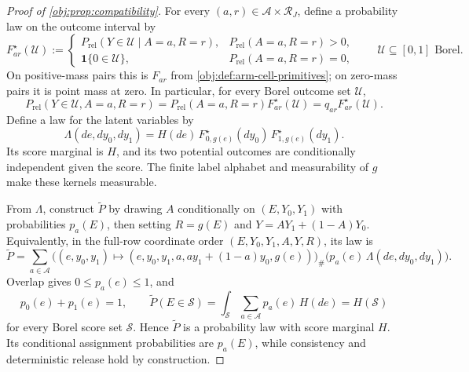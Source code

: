 \documentclass[11pt]{article}
\begin{document}
\begin{proof}[Proof of \cref{obj:prop:compatibility}]
For every \((a,r)\in\mathcal A\times\mathcal R_J\), define a probability law on the outcome interval by
\[
F^\star_{ar}(\mathcal U):=
\begin{cases}
P_{\mathrm{rel}}(Y\in\mathcal U\mid A=a,R=r), & P_{\mathrm{rel}}(A=a,R=r)>0,\\
\mathbf 1\{0\in\mathcal U\}, & P_{\mathrm{rel}}(A=a,R=r)=0,
\end{cases}
\qquad \mathcal U\subseteq[0,1]\text{ Borel}.
\]
On positive-mass pairs this is \(F_{ar}\) from \cref{obj:def:arm-cell-primitives}; on zero-mass pairs it is point mass at zero. In particular, for every Borel outcome set \(\mathcal U\),
\[
P_{\mathrm{rel}}(Y\in\mathcal U,A=a,R=r)
=P_{\mathrm{rel}}(A=a,R=r)F^\star_{ar}(\mathcal U)
=q_{ar}F^\star_{ar}(\mathcal U).
\]
Define a law for the latent variables by
\[
\Lambda(de,dy_0,dy_1)
=H(de)\,F^\star_{0,g(e)}(dy_0)\,F^\star_{1,g(e)}(dy_1).
\]
Its score marginal is \(H\), and its two potential outcomes are conditionally independent given the score. The finite label alphabet and measurability of \(g\) make these kernels measurable.

From \(\Lambda\), construct \(\widetilde P\) by drawing \(A\) conditionally on \((E,Y_0,Y_1)\) with probabilities \(p_a(E)\), then setting \(R=g(E)\) and \(Y=AY_1+(1-A)Y_0\). Equivalently, in the full-row coordinate order \((E,Y_0,Y_1,A,Y,R)\), its law is
\[
\widetilde P
=\sum_{a\in\mathcal A}
\bigl((e,y_0,y_1)\mapsto(e,y_0,y_1,a,ay_1+(1-a)y_0,g(e))\bigr)_{\#}
\bigl(p_a(e)\,\Lambda(de,dy_0,dy_1)\bigr).
\] Overlap gives \(0\leq p_a(e)\leq1\), and
\[
p_0(e)+p_1(e)=1,\qquad
\widetilde P(E\in\mathcal S)
=\int_{\mathcal S}\sum_{a\in\mathcal A}p_a(e)\,H(de)
=H(\mathcal S)
\]
for every Borel score set \(\mathcal S\). Hence \(\widetilde P\) is a probability law with score marginal \(H\). Its conditional assignment probabilities are \(p_a(E)\), while consistency and deterministic release hold by construction.


\end{proof}
\end{document}

